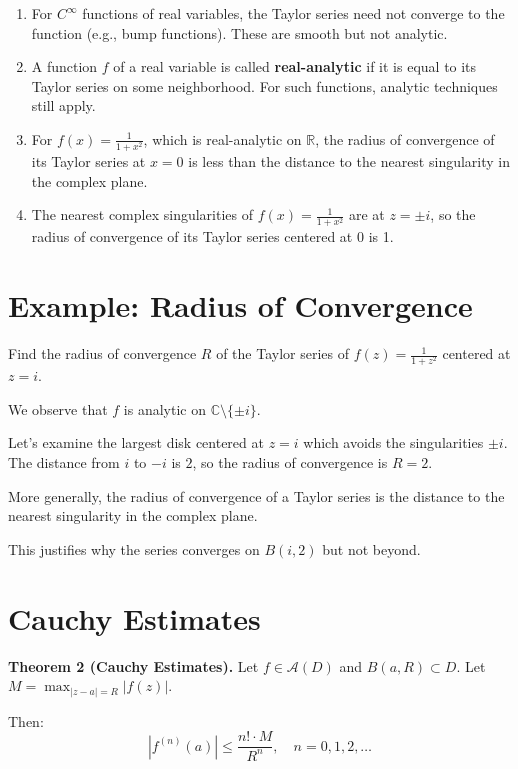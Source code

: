 \documentclass[12pt]{article}
\theoremstyle{definition} %
\theoremstyle{plain} %
\begin{document}
\begin{enumerate}
    \item For $C^\infty$ functions of real variables, the Taylor series need not converge to the function (e.g., bump functions). These are smooth but not analytic.

    \item A function $f$ of a real variable is called \textbf{real-analytic} if it is equal to its Taylor series on some neighborhood. For such functions, analytic techniques still apply.

    \item For $f(x) = \frac{1}{1 + x^2}$, which is real-analytic on $\mathbb{R}$, the radius of convergence of its Taylor series at $x = 0$ is less than the distance to the nearest singularity in the complex plane.

    \item The nearest complex singularities of $f(x) = \frac{1}{1 + x^2}$ are at $z = \pm i$, so the radius of convergence of its Taylor series centered at 0 is 1.
\end{enumerate}
\section*{Example: Radius of Convergence}

Find the radius of convergence $R$ of the Taylor series of $f(z) = \frac{1}{1 + z^2}$ centered at $z = i$.

We observe that $f$ is analytic on $\mathbb{C} \setminus \{\pm i\}$.

Let’s examine the largest disk centered at $z = i$ which avoids the singularities $\pm i$. The distance from $i$ to $-i$ is $2$, so the radius of convergence is $R = 2$.

More generally, the radius of convergence of a Taylor series is the distance to the nearest singularity in the complex plane.

This justifies why the series converges on $B(i, 2)$ but not beyond.

\section*{Cauchy Estimates}

\textbf{Theorem 2 (Cauchy Estimates).} Let $f \in \mathcal{A}(D)$ and $B(a, R) \subset D$. Let $M = \max_{|z - a| = R} |f(z)|$.

Then:
\[
|f^{(n)}(a)| \leq \frac{n! \cdot M}{R^n}, \quad n = 0, 1, 2, \dots
\]
\end{document}
